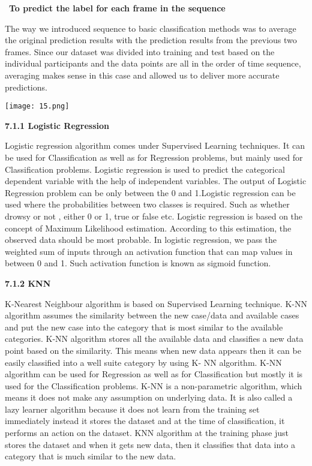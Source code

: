 \documentclass[a4paper,12pt]{article}
\begin{document}
~\textbf{To predict the label for each frame in the sequence}

The way we introduced sequence to basic classification methods was to
average the original prediction results with the prediction results from
the previous two frames. Since our dataset was divided into training and
test based on the individual participants and the data points are all in
the order of time sequence, averaging makes sense in this case and
allowed us to deliver more accurate predictions.

\texttt{[image: 15.png]}

\textbf{7.1.1 Logistic Regression}

Logistic regression algorithm comes under Supervised Learning techniques. It can be used for Classification as well as for Regression problems, but mainly used for Classification problems. Logistic regression is used to predict the categorical dependent variable with the help of independent variables. The output of Logistic Regression problem can be only between the 0 and 1.Logistic regression can be used where the probabilities between two classes is required. Such as whether drowsy or not , either 0 or 1, true or false etc. Logistic regression is based on the concept of Maximum Likelihood estimation. According to this estimation, the observed data should be most probable. In logistic regression, we pass the weighted sum of inputs through an activation function that can map values in between 0 and 1. Such activation function is known as sigmoid function.

\textbf{7.1.2 KNN}

K-Nearest Neighbour algorithm is based on Supervised Learning technique. K-NN algorithm assumes the similarity between the new case/data and available cases and put the new case into the category that is most similar to the available categories. K-NN algorithm stores all the available data and classifies a new data point based on the similarity. This means when new data appears then it can be easily classified into a well suite category by using K- NN algorithm. K-NN algorithm can be used for Regression as well as for Classification but mostly it is used for the Classification problems. K-NN is a non-parametric algorithm, which means it does not make any assumption on underlying data. It is also called a lazy learner algorithm because it does not learn from the training set immediately instead it stores the dataset and at the time of classification, it performs an action on the dataset. KNN algorithm at the training phase just stores the dataset and when it gets new data, then it classifies that data into a category that is much similar to the new data.
\end{document}
